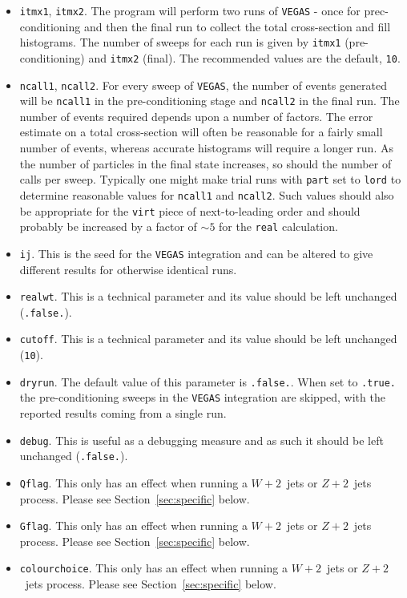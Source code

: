 \documentclass[12pt]{article}
\begin{document}
\begin{itemize}
\item {\tt itmx1}, {\tt itmx2}. The program will perform two runs of
{\tt VEGAS} - once for prec-conditioning and then the final run to
collect the total cross-section and fill histograms. The number of
sweeps for each run is given by {\tt itmx1} (pre-conditioning)
and {\tt itmx2} (final). The recommended values are the default,
{\tt 10}.

\item {\tt ncall1}, {\tt ncall2}. For every sweep of {\tt VEGAS},
the number of events generated will be {\tt ncall1} in the
pre-conditioning stage and {\tt ncall2} in the final run. The number
of events required depends upon a number of factors. The error
estimate on a total cross-section will often be reasonable for a
fairly small number of events, whereas accurate histograms will
require a longer run. As the number of particles in the final state
increases, so should the number of calls per sweep. Typically one
might make trial runs with {\tt part} set to {\tt lord} to determine
reasonable values for {\tt ncall1} and {\tt ncall2}. Such values
should also be appropriate for the {\tt virt} piece of
next-to-leading order and should probably be increased by a factor of
$\sim 5$ for the {\tt real} calculation.

\item {\tt ij}. This is the seed for the {\tt VEGAS} integration
and can be altered to give different results for otherwise identical
runs.

\item {\tt realwt}. This is a technical parameter and its value
should be left unchanged ({\tt .false.}).

\item {\tt cutoff}. This is a technical parameter and its value
should be left unchanged ({\tt 10}).

\item {\tt dryrun}. The default value of this parameter is
{\tt .false.}. When set to {\tt .true.} the pre-conditioning sweeps
in the {\tt VEGAS} integration are skipped, with the reported
results coming from a single run.

\item {\tt debug}. This is useful as a debugging measure and as
such it should be left unchanged ({\tt .false.}).

\item {\tt Qflag}. This only has an effect when running a
$W+2$~jets or $Z+2$~jets process. Please see Section~\ref{sec:specific}
below.

\item {\tt Gflag}. This only has an effect when running a
$W+2$~jets or $Z+2$~jets process. Please see Section~\ref{sec:specific}
below.

\item {\tt colourchoice}. This only has an effect when running a
$W+2$~jets or $Z+2$~jets process. Please see Section~\ref{sec:specific}
below.

\end{itemize}
\end{document}
